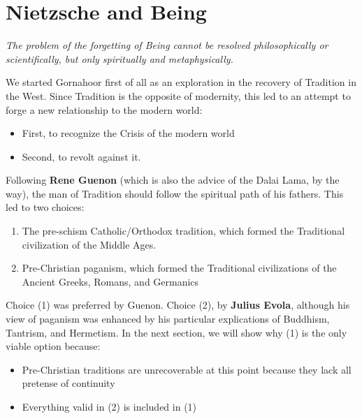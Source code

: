 \section{Nietzsche and Being}

\emph{The problem of the forgetting of Being cannot be resolved philosophically or scientifically, but only spiritually and metaphysically.}

We started Gornahoor first of all as an exploration in the recovery of Tradition in the West. Since Tradition is the opposite of modernity, this led to an attempt to forge a new relationship to the modern world:

\begin{itemize}


\item First, to recognize the Crisis of the modern world

\item Second, to revolt against it.
\end{itemize}


Following \textbf{Rene Guenon} (which is also the advice of the Dalai Lama, by the way), the man of Tradition should follow the spiritual path of his fathers. This led to two choices:

\begin{enumerate}


\item The pre-schism Catholic/Orthodox tradition, which formed the Traditional civilization of the Middle Ages.

\item Pre-Christian paganism, which formed the Traditional civilizations of the Ancient Greeks, Romans, and Germanics
\end{enumerate}


Choice (1) was preferred by Guenon. Choice (2), by \textbf{Julius Evola}, although his view of paganism was enhanced by his particular explications of Buddhism, Tantrism, and Hermetism. In the next section, we will show why (1) is the only viable option because:

\begin{itemize}


\item Pre-Christian traditions are unrecoverable at this point because they lack all pretense of continuity

\item Everything valid in (2) is included in (1)
\end{itemize}


